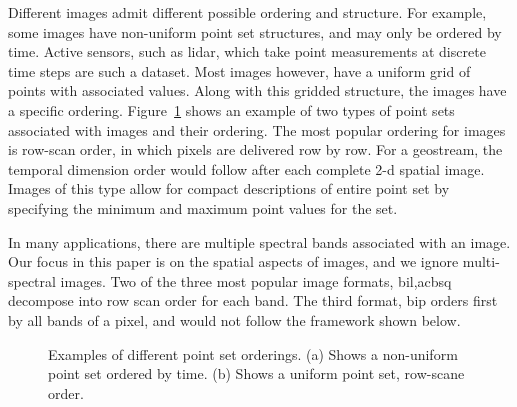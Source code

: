 \documentclass{vldb}
\begin{document}
Different images admit different possible ordering and structure.  For
example, some images have non-uniform point set structures, and may
only be ordered by time.  Active sensors, such as lidar, which take
point measurements at discrete time steps are such a dataset.  Most
images however, have a uniform grid of points with associated values.
Along with this gridded structure, the images have a specific
ordering. Figure~\ref{fig:lidar} shows an example of two types of
point sets associated with images and their ordering.  The most popular
ordering for images is row-scan order, in which pixels are delivered
row by row.  For a geostream, the temporal dimension order would
follow after each complete 2-d spatial image.  Images of this type
allow for compact descriptions of entire point set by specifying the
minimum and maximum point values for the set.

In many applications, there are multiple spectral bands associated
with an image.  Our focus in this paper is on the spatial aspects of
images, and we ignore multi-spectral images.  Two of the three most
popular image formats, \ac{bil},ac{bsq} decompose into row scan order
for each band.  The third format, \ac{bip} orders first by all bands
of a pixel, and would not follow the framework shown below.

\begin{figure}[htbp]
  \centering
\label{fig:lidar}
\caption{%
%
  Examples of different point set orderings.  (a) Shows a non-uniform
  point set ordered by time.  (b) Shows a uniform point set, row-scane
  order.  }
\end{figure}
\end{document}
